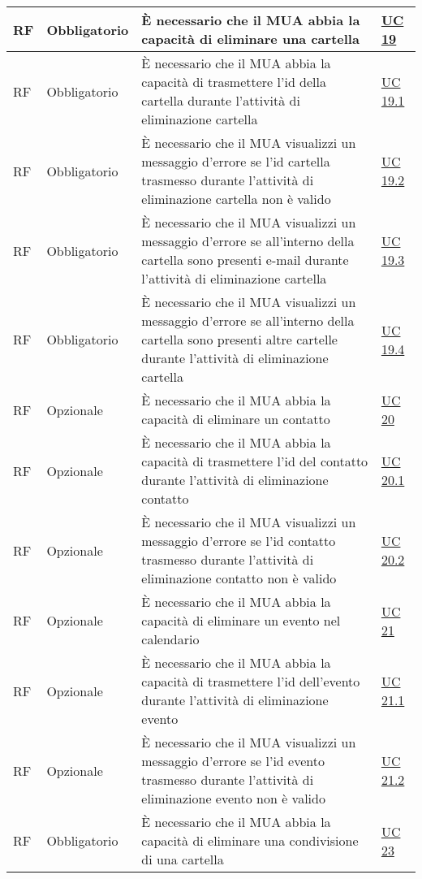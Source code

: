 \begin{longtable}{*{1}{>{\centering\arraybackslash}p{1.5cm}}*{1}{>{\centering\arraybackslash}p{2.5cm}}p{6cm}*{1}{>{\centering\arraybackslash}p{3cm}}}
    RF & Obbligatorio & È necessario che il MUA abbia la capacità di eliminare una cartella & \hyperref[sec:UC19]{UC 19}
    \\\hline
    RF & Obbligatorio & È necessario che il MUA abbia la capacità di trasmettere l'id della cartella durante l'attività di eliminazione cartella & \hyperref[sec:UC19.1]{UC 19.1}
    \\\hline
    RF & Obbligatorio & È necessario che il MUA visualizzi un messaggio d'errore se l'id cartella trasmesso durante l'attività di eliminazione cartella non è valido & \hyperref[sec:UC19.2]{UC 19.2}
    \\\hline
    RF & Obbligatorio & È necessario che il MUA visualizzi un messaggio d'errore se all'interno della cartella sono presenti e-mail durante l'attività di eliminazione cartella & \hyperref[sec:UC19.3]{UC 19.3}
    \\\hline
    RF & Obbligatorio & È necessario che il MUA visualizzi un messaggio d'errore se all'interno della cartella sono presenti altre cartelle durante l'attività di eliminazione cartella & \hyperref[sec:UC19.4]{UC 19.4}
    \\\hline
    RF & Opzionale & È necessario che il MUA abbia la capacità di eliminare un contatto & \hyperref[sec:UC20]{UC 20}
    \\\hline
    RF & Opzionale & È necessario che il MUA abbia la capacità di trasmettere l'id del contatto durante l'attività di eliminazione contatto & \hyperref[sec:UC20.1]{UC 20.1}
    \\\hline
    RF & Opzionale & È necessario che il MUA visualizzi un messaggio d'errore se l'id contatto trasmesso durante l'attività di eliminazione contatto non è valido & \hyperref[sec:UC20.2]{UC 20.2}
    \\\hline
    RF & Opzionale & È necessario che il MUA abbia la capacità di eliminare un evento nel calendario & \hyperref[sec:UC21]{UC 21}
    \\\hline
    RF & Opzionale & È necessario che il MUA abbia la capacità di trasmettere l'id dell'evento durante l'attività di eliminazione evento & \hyperref[sec:UC21.1]{UC 21.1}
    \\\hline
    RF & Opzionale & È necessario che il MUA visualizzi un messaggio d'errore se l'id evento trasmesso durante l'attività di eliminazione evento non è valido & \hyperref[sec:UC21.2]{UC 21.2}
    \\\hline
    RF & Obbligatorio & È necessario che il MUA abbia la capacità di eliminare una condivisione di una cartella & \hyperref[sec:UC23]{UC 23}

\end{longtable}
